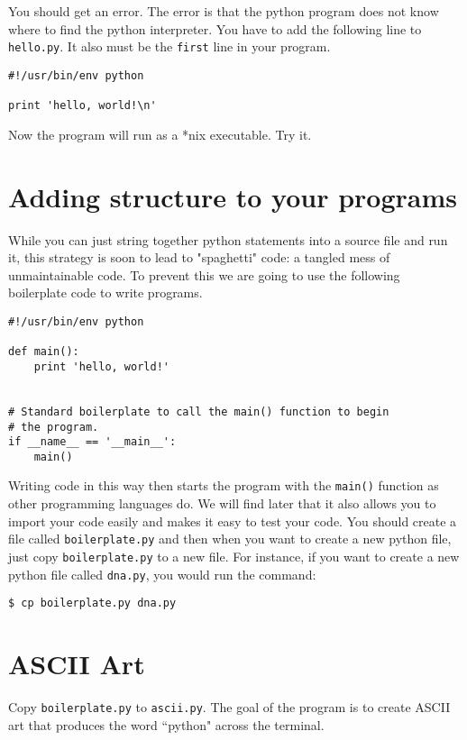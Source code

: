\documentclass[12pt]{article}
\begin{document}
You should get an error. The error is that the python program does not know where to find the python interpreter. You have to add the following line to \texttt{hello.py}. It also must be the \texttt{first} line in your program.

\begin{lstlisting}[style=c]
#!/usr/bin/env python

print 'hello, world!\n'
\end{lstlisting}

Now the program will run as a *nix executable. Try it.

\section*{Adding structure to your programs}

While you can just string together python statements into a source file and run it, this strategy is soon to lead to "spaghetti" code: a tangled mess of unmaintainable code. To prevent this we are going to use the following boilerplate code to write programs.

\begin{lstlisting}[style=c]
#!/usr/bin/env python

def main():
    print 'hello, world!'


# Standard boilerplate to call the main() function to begin
# the program.
if __name__ == '__main__':
    main()
\end{lstlisting}

Writing code in this way then starts the program with the \texttt{main()} function as other programming languages do. We will find later that it also allows you to import your code easily and makes it easy to test your code. You should create a file called \texttt{boilerplate.py} and then when you want to create a new python file, just copy \texttt{boilerplate.py} to a new file. For instance, if you want to create a new python file called \texttt{dna.py}, you would run the command:

\begin{lstlisting}[style=bash]
$ cp boilerplate.py dna.py
\end{lstlisting}

\pagebreak

\section{ASCII Art}

Copy \texttt{boilerplate.py} to \texttt{ascii.py}. The goal of the program is to create ASCII art that produces the word ``python" across the terminal.
\end{document}
